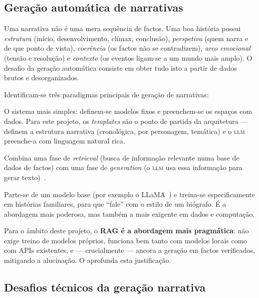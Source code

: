 \subsection{Geração automática de narrativas}
\label{sub:geracao_narrativa}

Uma narrativa não é uma mera sequência de factos. Uma boa história possui
\emph{estrutura} (início, desenvolvimento, clímax, conclusão),
\emph{perspetiva} (quem narra e de que ponto de vista), \emph{coerência}
(os factos não se contradizem), \emph{arco emocional} (tensão e resolução)
e \emph{contexto} (os eventos ligam-se a um mundo mais amplo). O desafio
da geração automática consiste em obter tudo isto a partir de dados
brutos e desorganizados.

Identificam-se três paradigmas principais de geração de narrativas:

\begin{description}[leftmargin=*]
  \item[Paradigma 1 — \emph{Template-Based}.] O sistema mais simples:
  definem-se modelos fixos e preenchem-se os espaços com dados. Para este
  projeto, os \emph{templates} são o ponto de partida da arquitetura —
  definem a estrutura narrativa (cronológica, por personagem, temática) e
  o \textsc{llm} preenche-a com linguagem natural rica.
  \item[Paradigma 2 — \emph{Retrieval-Augmented Generation} (RAG).]
  Combina uma fase de \emph{retrieval} (busca de informação relevante numa
  base de dados de factos) com uma fase de \emph{generation} (o
  \textsc{llm} usa essa informação para gerar texto)~\cite{lewis2020rag}.
  \item[Paradigma 3 — \emph{Fine-tuning} e modelos especializados.]
  Parte-se de um modelo base (por exemplo o LLaMA~\cite{touvron2023llama})
  e treina-se especificamente em histórias familiares, para que ``fale''
  com o estilo de um biógrafo. É a abordagem mais poderosa, mas também a
  mais exigente em dados e computação.
\end{description}

Para o âmbito deste projeto, o \textbf{RAG é a abordagem mais
pragmática}: não exige treino de modelos próprios, funciona bem tanto com
modelos locais como com APIs existentes, e — crucialmente — ancora a
geração em factos verificados, mitigando a alucinação. O
 aprofunda esta justificação.

\subsection{Desafios técnicos da geração narrativa}
\label{sub:desafios}

